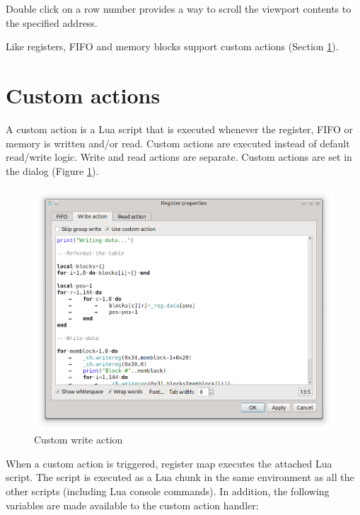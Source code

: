 \documentclass[a4paper,12pt,twoside,extrafontsizes]{memoir}
\begin{document}
Double click on a row number provides a way to scroll the viewport contents to the specified address.

Like registers, FIFO and memory blocks support custom actions (Section \ref{sec:customactions}).

\section{Custom actions}
\label{sec:customactions}

A custom action is a Lua script that is executed whenever the register, FIFO or memory is written and/or read. Custom actions are executed instead of default read/write logic. Write and read actions are separate. Custom actions are set in the  dialog (Figure \ref{fig:registermapaction}).

\begin{figure}[htbp]
\centering
\includegraphics[scale=0.7]{images/registermapaction.png}
\caption{Custom write action}
\label{fig:registermapaction}
\end{figure}

When a custom action is triggered, register map executes the attached Lua script. The script is executed as a Lua chunk in the same environment as all the other scripts (including Lua console commands). In addition, the following variables are made available to the custom action handler:
\end{document}
